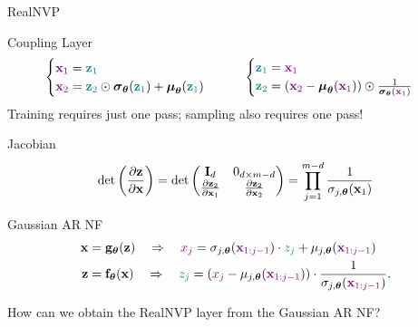 \documentclass{beamer}
\begin{document}
\begin{frame}{RealNVP}
	\begin{block}{Coupling Layer}
		\vspace{-0.7cm}
		\[
		 \begin{cases} {\color{violet}\mathbf{x}_1} = {\color{teal}\mathbf{z}_1} \\ {\color{violet}\mathbf{x}_2} = {\color{teal}\mathbf{z}_2} \odot \boldsymbol{\sigma}_{\boldsymbol{\theta}}({\color{teal}\mathbf{z}_1}) + \boldsymbol{\mu}_{\boldsymbol{\theta}}({\color{teal}\mathbf{z}_1}) \end{cases}
			\qquad
		\begin{cases} {\color{teal}\mathbf{z}_1} ={\color{violet} \mathbf{x}_1} \\ {\color{teal}\mathbf{z}_2} = ({\color{violet}\mathbf{x}_2} - \boldsymbol{\mu}_{\boldsymbol{\theta}}({\color{violet}\mathbf{x}_1})) \odot \frac{1}{\boldsymbol{\sigma}_{\boldsymbol{\theta}}({\color{violet}\mathbf{x}_1})} \end{cases}
		\]
		Training requires just one pass; sampling also requires one pass!
	\end{block}
	\begin{block}{Jacobian}
		\vspace{-0.5cm}
		\[
		\det \left( \frac{\partial \mathbf{z}}{\partial \mathbf{x}} \right) = \det 
		\begin{pmatrix}
			\mathbf{I}_d & 0_{d \times m-d} \\
			\frac{\partial \mathbf{z}_2}{\partial \mathbf{x}_1} & \frac{\partial \mathbf{z}_2}{\partial \mathbf{x}_2}
		\end{pmatrix} = \prod_{j=1}^{m-d} \frac{1}{\sigma_{j, \boldsymbol{\theta}}(\mathbf{x}_1)}
		\]
		\vspace{-0.5cm}
	\end{block}
	\begin{block}{Gaussian AR NF}
		\vspace{-0.6cm}
		\begin{align*}
			\mathbf{x} &= \mathbf{g}_{\boldsymbol{\theta}}(\mathbf{z}) \quad \Rightarrow \quad {\color{violet}x_j} = \sigma_{j, \boldsymbol{\theta}} ({\color{violet}\mathbf{x}_{1:j-1}}) \cdot {\color{teal} z_j} + \mu_{j, \boldsymbol{\theta}}({\color{violet}\mathbf{x}_{1:j-1}}) \\
			\mathbf{z} &= \mathbf{f}_{\boldsymbol{\theta}}(\mathbf{x}) \quad \Rightarrow \quad {\color{teal} z_j} = \left({\color{violet} x_j} - \mu_{j, \boldsymbol{\theta}}({\color{violet}\mathbf{x}_{1:j-1}}) \right) \cdot \frac{1}{\sigma_{j, \boldsymbol{\theta}} ({\color{violet} \mathbf{x}_{1:j-1}}) }.
		\end{align*}
		\vspace{-0.5cm}
	\end{block}
	How can we obtain the RealNVP layer from the Gaussian AR NF?
	
\end{frame}
\end{document}
